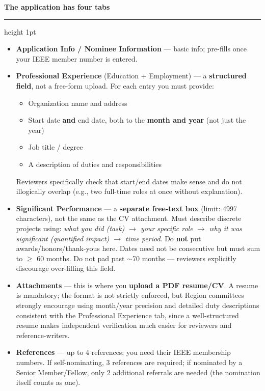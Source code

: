 \documentclass[10.5pt]{article}
\newcommand{\cvsection}[1]{%
  \vspace{10pt}
  {\color{accent}\Large\bfseries #1}\par
  \vspace{2pt}
  {\color{accent}\hrule height 1pt}
  \vspace{6pt}
}
\begin{document}
\cvsection{The application has four tabs}
\begin{itemize}
  \item \textbf{Application Info / Nominee Information} --- basic info; pre-fills once your IEEE member number is entered.
  \item \textbf{Professional Experience} (Education + Employment) --- a \textbf{structured field}, not a free-form upload. For each entry you must provide:
  \begin{itemize}
    \item Organization name and address
    \item Start date \textbf{and} end date, both to the \textbf{month and year} (not just the year)
    \item Job title / degree
    \item A description of duties and responsibilities
  \end{itemize}
  Reviewers specifically check that start/end dates make sense and do not illogically overlap (e.g., two full-time roles at once without explanation).
  \item \textbf{Significant Performance} --- a \textbf{separate free-text box} (limit: 4997 characters), not the same as the CV attachment. Must describe discrete projects using: \textit{what you did (task) $\to$ your specific role $\to$ why it was significant (quantified impact) $\to$ time period}. Do \textbf{not} put awards/honors/thank-yous here. Dates need not be consecutive but must sum to $\geq$ 60 months. Do not pad past $\sim$70 months --- reviewers explicitly discourage over-filling this field.
  \item \textbf{Attachments} --- this is where you \textbf{upload a PDF resume/CV}. A resume is mandatory; the format is not strictly enforced, but Region committees strongly encourage using month/year precision and detailed duty descriptions consistent with the Professional Experience tab, since a well-structured resume makes independent verification much easier for reviewers and reference-writers.
  \item \textbf{References} --- up to 4 references; you need their IEEE membership numbers. If self-nominating, 3 references are required; if nominated by a Senior Member/Fellow, only 2 additional referrals are needed (the nomination itself counts as one).
\end{itemize}
\end{document}
